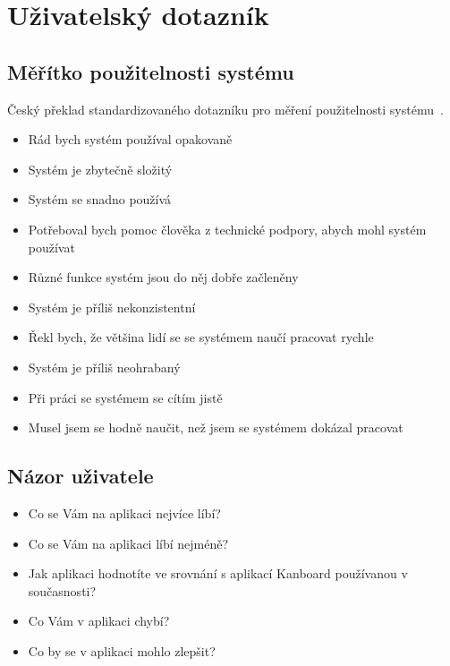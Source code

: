 \chapter{Uživatelský dotazník}\label{sec:questionarre}

\section{Měřítko použitelnosti systému}
Český překlad standardizovaného dotazníku pro měření použitelnosti systému~\cite{bib:sus-cz}.

\begin{itemize}
  \item Rád bych systém používal opakovaně
  \item Systém je zbytečně složitý
  \item Systém se snadno používá
  \item Potřeboval bych pomoc člověka z technické podpory, abych mohl systém používat
  \item Různé funkce systém jsou do něj dobře začleněny
  \item Systém je příliš nekonzistentní
  \item Řekl bych, že většina lidí se se systémem naučí pracovat rychle
  \item Systém je příliš neohrabaný
  \item Při práci se systémem se cítím jistě
  \item Musel jsem se hodně naučit, než jsem se systémem dokázal pracovat
\end{itemize}

\section{Názor uživatele}

\begin{itemize}
  \item Co se Vám na aplikaci nejvíce líbí?
  \item Co se Vám na aplikaci líbí nejméně?
  \item Jak aplikaci hodnotíte ve srovnání s aplikací Kanboard používanou v současnosti?
  \item Co Vám v aplikaci chybí?
  \item Co by se v aplikaci mohlo zlepšit?
\end{itemize}